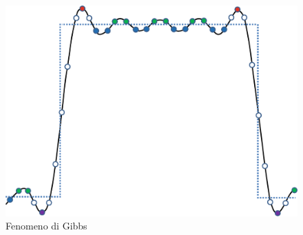 \begin{figure}[H]
  \centering
  \captionsetup{justification=raggedright}
  \includegraphics[scale=0.35]{Figures/SAO_Gibbs}
  \caption{Fenomeno di Gibbs}
\end{figure}

